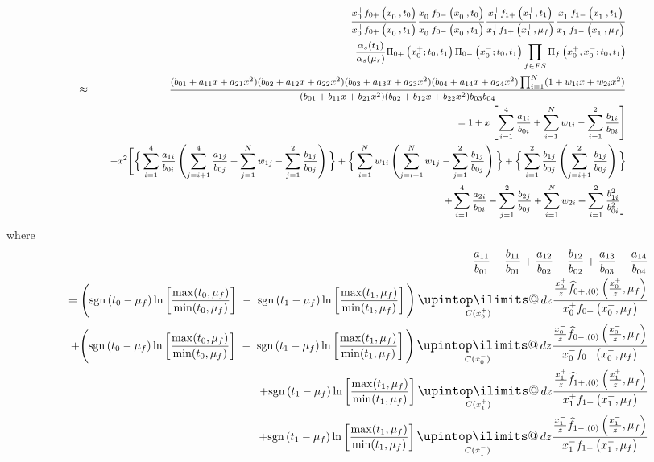 \documentclass[a4paper,11pt]{article}
\makeatletter
\newcommand{\mksmall}[1]{\textnormal{\smaller$#1$}}
\newcommand{\sgn}[2]{\mathrm{sgn}\left(#1-#2\right)}
\newcommand{\xfhat}[3]{#2 \widehat{f}_{#1}\left(#2, #3\right)}
\newcommand{\xf}[3]{#2 f_{#1}\left(#2, #3\right)}
\newcommand{\noem}[4]{\Pi_{#1}\left(#2; #3, #4\right)}
\newcommand{\upint}{\DOTSI\upintop\ilimits@}
\renewcommand{\int}{\mathop{\mathlarger{\upint}}}
\makeatother
\begin{document}
\begin{eqnarray*}
&&\mksmall{\frac{ \xf{0+}{x_0^+}{t_0} }{ \xf{0+}{x_0^+}{t_1} }
\frac{\xf{0-}{x_0^-}{t_0}}{\xf{0-}{x_0^-}{t_1}}
\frac{\xf{1+}{x_1^+}{t_1}}{\xf{1+}{x_1^+}{\mu_f}}
\frac{\xf{1-}{x_1^-}{t_1}}{\xf{1-}{x_1^-}{\mu_f}}}\\
&&
%
\mksmall{\frac{\alpha_s(t_1)}{\alpha_s(\mu_r)}
\noem{0+}{x_0^+}{t_0}{t_1}
\noem{0-}{x_0^-}{t_0}{t_1}
\prod_{f\in FS} \noem{f}{x_0^+,x_0^-}{t_0}{t_1}}\\
\approx
&&
\mksmall{
\frac{(b_{01} + a_{11} x + a_{21} x^2) (b_{02} + a_{12} x + a_{22} x^2) (b_{03} + a_{13} x + a_{23} x^2) (b_{04} + a_{14} x + a_{24} x^2) \prod_{i=1}^N (1 + w_{1i} x +w_{2i} x^2)} {
(b_{01} + b_{11} x + b_{21} x^2 ) (b_{02} + b_{12} x + b_{22} x^2 ) b_{03}  b_{04}}
}
\\&&\quad
\mksmall{
= 1
+ x \left[ \sum_{i=1}^4 \frac{a_{1i}}{b_{0i}} +  \sum_{i=1}^N w_{1i}  - \sum_{i=1}^2\frac{b_{1i}}{b_{0i}} \right]}
\\&&\quad
\mksmall{
+ x^2 \Bigg[ \Big\{\sum_{i=1}^4 \frac{a_{1i}}{b_{0i}} \left(  \sum_{j=i+1}^4 \frac{a_{1j}}{b_{0j}} +  \sum_{j=1}^N w_{1j}  - \sum_{j=1}^2\frac{b_{1j}}{b_{0j}} \right)\Big\}
+ \Big\{\sum_{i=1}^N w_{1i} \left(   \sum_{j=i+1}^N w_{1j} - \sum_{j=1}^2\frac{b_{1j}}{b_{0j}} \right)\Big\}
+ \Big\{\sum_{i=1}^2\frac{b_{1j}}{b_{0j}}  \left( \sum_{j=i+1}^2\frac{b_{1j}}{b_{0j}} \right)\Big\}
}
\\&&\quad
\mksmall{
+ \sum_{i=1}^4 \frac{a_{2i}}{b_{0i}} - \sum_{j=1}^2\frac{b_{2j}}{b_{0j}} + \sum_{i=1}^N w_{2i}
+ \sum_{i=1}^2 \frac{b_{1i}^2}{b_{0i}^2}
\Bigg]}
\end{eqnarray*}
where
\begin{eqnarray*}
&&\frac{a_{11}}{b_{01}} -  \frac{b_{11}}{b_{01}} + \frac{a_{12}}{b_{02}} - \frac{b_{12}}{b_{02}}
+ \frac{a_{13}}{b_{03}} + \frac{a_{14}}{b_{04}} 
\\
&&=
\Bigg(\sgn{t_0}{\mu_f}
 \ln\left[\frac{\max(t_0,\mu_f)}{\min(t_0,\mu_f)}\right]
~-~
\sgn{t_1}{\mu_f}
 \ln\left[\frac{\max(t_1,\mu_f)}{\min(t_1,\mu_f)}\right]
\Bigg)
\int\displaylimits_{C(x_0^+)}  dz \frac{\xfhat{0+,(0)}{\frac{x_0^+}{z}}{\mu_f} }{ \xf{0+}{x_0^+}{\mu_f} }
\\
&&+
\Bigg(\sgn{t_0}{\mu_f}
 \ln\left[\frac{\max(t_0,\mu_f)}{\min(t_0,\mu_f)}\right]
~-~
\sgn{t_1}{\mu_f}
 \ln\left[\frac{\max(t_1,\mu_f)}{\min(t_1,\mu_f)}\right]
\Bigg)
\int\displaylimits_{C(x_0^-)}  dz \frac{\xfhat{0-,(0)}{\frac{x_0^-}{z}}{\mu_f} }{ \xf{0-}{x_0^-}{\mu_f} }
\\
&&+
\sgn{t_1}{\mu_f}
 \ln\left[\frac{\max(t_1,\mu_f)}{\min(t_1,\mu_f)}\right]
\int\displaylimits_{C(x_1^+)}  dz \frac{\xfhat{1+,(0)}{\frac{x_1^+}{z}}{\mu_f} }{ \xf{1+}{x_1^+}{\mu_f} }
\\
&&+
\sgn{t_1}{\mu_f}
 \ln\left[\frac{\max(t_1,\mu_f)}{\min(t_1,\mu_f)}\right]
\int\displaylimits_{C(x_1^-)}  dz \frac{\xfhat{1-,(0)}{\frac{x_1^-}{z}}{\mu_f} }{ \xf{1-}{x_1^-}{\mu_f} }
\end{eqnarray*}
\end{document}
